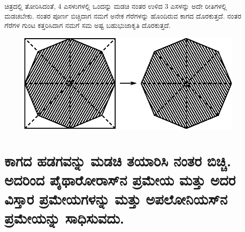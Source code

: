  ಚಿತ್ರದಲ್ಲಿ ತೋರಿಸಿದಂತೆ, 4 ಎಸಳುಗಳಲ್ಲಿ ಒಂದನ್ನು ಮಡಚಿ ನಂತರ ಉಳಿದ 3 ಎಸಳನ್ನು ಅದೇ ರೀತಿಗಳಲ್ಲಿ ಮಡಚಬೇಕು. ನಂತರ ಪೂರ್ಣ ಬಿಚ್ಚಿದಾಗ ನಮಗೆ ಅನೇಕ ಗೆರೆಗಳನ್ನು ಹೊಂದಿರುವ ಕಾಗದ ದೊರಕುತ್ತದೆ. ನಂತರ ಗೆರೆಗಳ ಗುಂಟ ಕತ್ತರಿಸಿದಾಗ ನಮಗೆ ಸಮ ಅಷ್ಟ ಬಹುಭುಜಾಕೃತಿ ದೊರಕುತ್ತದೆ. 
 \begin{figure}[H]
\centering
\includegraphics[scale=.98]{src/figure/chap1/fig1-16d2.eps}
\end{figure}



\section{ಕಾಗದ ಹಡಗವನ್ನು ಮಡಚಿ ತಯಾರಿಸಿ ನಂತರ ಬಿಚ್ಚಿ. ಅದರಿಂದ ಪೈಥಾರೋರಾಸ್‌ನ ಪ್ರಮೇಯ ಮತ್ತು ಅದರ ವಿಸ್ತಾರ ಪ್ರಮೇಯಗಳನ್ನು ಮತ್ತು ಅಪಲೋನಿಯಸ್‌ನ ಪ್ರಮೇಯನ್ನು ಸಾಧಿಸುವದು.}\label{sec1.10} %


